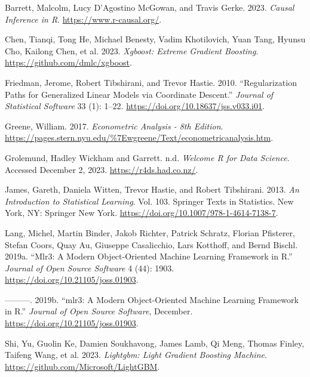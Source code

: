 \documentclass[
  letterpaper,
]{krantz}
\newlength{\cslhangindent}
\newlength{\cslentryspacingunit} %
\newenvironment{CSLReferences}[2] %
 {%
  \setlength{\parindent}{0pt}
  \ifodd #1
  \let\oldpar\par
  \def\par{\hangindent=\cslhangindent\oldpar}
  \fi
  \setlength{\parskip}{#2\cslentryspacingunit}
 }%
 {}
\begin{document}
\hypertarget{refs}{}
\begin{CSLReferences}{1}{0}
\leavevmode{}%
Barrett, Malcolm, Lucy D'Agostino McGowan, and Travis Gerke. 2023.
\emph{Causal {Inference} in {R}}. \url{https://www.r-causal.org/}.

\leavevmode{}%
Chen, Tianqi, Tong He, Michael Benesty, Vadim Khotilovich, Yuan Tang,
Hyunsu Cho, Kailong Chen, et al. 2023. \emph{Xgboost: Extreme Gradient
Boosting}. \url{https://github.com/dmlc/xgboost}.

\leavevmode{}%
Friedman, Jerome, Robert Tibshirani, and Trevor Hastie. 2010.
{``Regularization Paths for Generalized Linear Models via Coordinate
Descent.''} \emph{Journal of Statistical Software} 33 (1): 1--22.
\url{https://doi.org/10.18637/jss.v033.i01}.

\leavevmode{}%
Greene, William. 2017. \emph{Econometric {Analysis} - 8th {Edition}}.
\url{https://pages.stern.nyu.edu/%7Ewgreene/Text/econometricanalysis.htm}.

\leavevmode{}%
Grolemund, Hadley Wickham and Garrett. n.d. \emph{Welcome {\textbar} {R}
for {Data} {Science}}. Accessed December 2, 2023.
\url{https://r4ds.had.co.nz/}.

\leavevmode{}%
James, Gareth, Daniela Witten, Trevor Hastie, and Robert Tibshirani.
2013. \emph{An {Introduction} to {Statistical} {Learning}}. Vol. 103.
Springer {Texts} in {Statistics}. New York, NY: Springer New York.
\url{https://doi.org/10.1007/978-1-4614-7138-7}.

\leavevmode{}%
Lang, Michel, Martin Binder, Jakob Richter, Patrick Schratz, Florian
Pfisterer, Stefan Coors, Quay Au, Giuseppe Casalicchio, Lars Kotthoff,
and Bernd Bischl. 2019a. {``Mlr3: {A} Modern Object-Oriented Machine
Learning Framework in {R}.''} \emph{Journal of Open Source Software} 4
(44): 1903. \url{https://doi.org/10.21105/joss.01903}.

\leavevmode{}%
---------. 2019b. {``{mlr3}: A Modern Object-Oriented Machine Learning
Framework in {R}.''} \emph{Journal of Open Source Software}, December.
\url{https://doi.org/10.21105/joss.01903}.

\leavevmode{}%
Shi, Yu, Guolin Ke, Damien Soukhavong, James Lamb, Qi Meng, Thomas
Finley, Taifeng Wang, et al. 2023. \emph{Lightgbm: Light Gradient
Boosting Machine}. \url{https://github.com/Microsoft/LightGBM}.


\end{CSLReferences}
\end{document}
